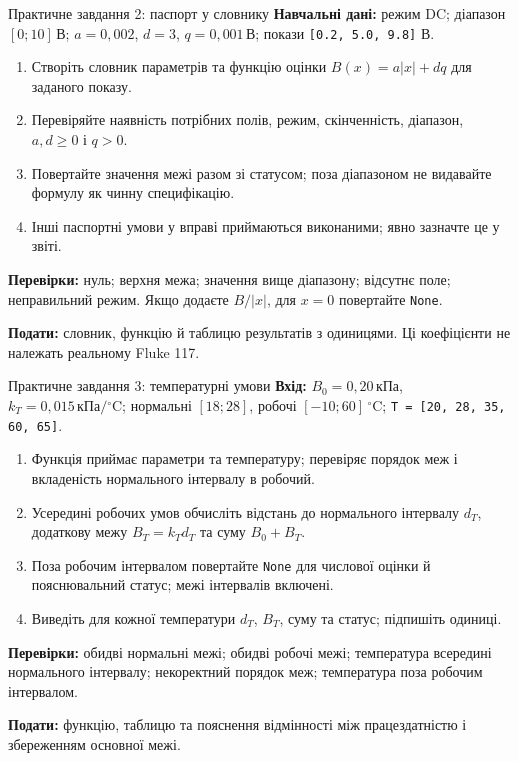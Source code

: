 \documentclass[aspectratio=169,11pt]{beamer}
\newcommand{\unit}[1]{\,\text{#1}}
\begin{document}
\begin{frame}{Практичне завдання 2: паспорт у словнику}
\small
\textbf{Навчальні дані:} режим DC; діапазон $[0;10]\unit{В}$; $a=0{,}002$, $d=3$, $q=0{,}001\unit{В}$; покази \texttt{[0.2, 5.0, 9.8]} В.
\begin{enumerate}
\item Створіть словник параметрів та функцію оцінки $B(x)=a|x|+dq$ для заданого показу.
\item Перевіряйте наявність потрібних полів, режим, скінченність, діапазон, $a,d\ge0$ і $q>0$.
\item Повертайте значення межі разом зі статусом; поза діапазоном не видавайте формулу як чинну специфікацію.
\item Інші паспортні умови у вправі приймаються виконаними; явно зазначте це у звіті.
\end{enumerate}
\textbf{Перевірки:} нуль; верхня межа; значення вище діапазону; відсутнє поле; неправильний режим. Якщо додаєте $B/|x|$, для $x=0$ повертайте \texttt{None}.
\medskip

\textbf{Подати:} словник, функцію й таблицю результатів з одиницями. Ці коефіцієнти не належать реальному Fluke 117.
\end{frame}

\begin{frame}{Практичне завдання 3: температурні умови}
\small
\textbf{Вхід:} $B_0=0{,}20\unit{кПа}$, $k_T=0{,}015\unit{кПа}/{}^\circ\mathrm C$; нормальні $[18;28]$, робочі $[-10;60]\,{}^\circ\mathrm C$; \texttt{T = [20, 28, 35, 60, 65]}.
\begin{enumerate}
\item Функція приймає параметри та температуру; перевіряє порядок меж і вкладеність нормального інтервалу в робочий.
\item Усередині робочих умов обчисліть відстань до нормального інтервалу $d_T$, додаткову межу $B_T=k_Td_T$ та суму $B_0+B_T$.
\item Поза робочим інтервалом повертайте \texttt{None} для числової оцінки й пояснювальний статус; межі інтервалів включені.
\item Виведіть для кожної температури $d_T$, $B_T$, суму та статус; підпишіть одиниці.
\end{enumerate}
\textbf{Перевірки:} обидві нормальні межі; обидві робочі межі; температура всередині нормального інтервалу; некоректний порядок меж; температура поза робочим інтервалом.
\medskip

\textbf{Подати:} функцію, таблицю та пояснення відмінності між працездатністю і збереженням основної межі.
\end{frame}
\end{document}
